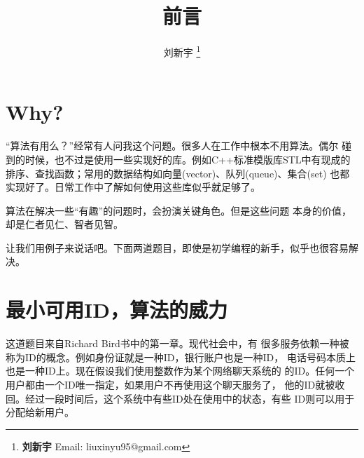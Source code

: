 \documentclass[UTF8]{article}
\begin{document}


\title{前言}

\author{刘新宇
\thanks{{\bfseries 刘新宇} \newline
  Email: liuxinyu95@gmail.com \newline}
  }

\maketitle
\fi


\section{Why?}
\label{why}

“算法有用么？”经常有人问我这个问题。很多人在工作中根本不用算法。偶尔
碰到的时候，也不过是使用一些实现好的库。例如C++标准模版库STL中有现成的
排序、查找函数；常用的数据结构如向量(vector)、队列(queue)、集合(set)
也都实现好了。日常工作中了解如何使用这些库似乎就足够了。

算法在解决一些“有趣”的问题时，会扮演关键角色。但是这些问题
本身的价值，却是仁者见仁、智者见智。

让我们用例子来说话吧。下面两道题目，即使是初学编程的新手，似乎也很容易解决。

\section{最小可用ID，算法的威力}
\label{min-free} 

这道题目来自Richard Bird书中的第一章\cite{Bird-book}。现代社会中，有
很多服务依赖一种被称为ID的概念。例如身份证就是一种ID，银行账户也是一种ID，
电话号码本质上也是一种ID上。现在假设我们使用整数作为某个网络聊天系统的
的ID。任何一个用户都由一个ID唯一指定，如果用户不再使用这个聊天服务了，
他的ID就被收回。经过一段时间后，这个系统中有些ID处在使用中的状态，有些
ID则可以用于分配给新用户。
\end{document}
